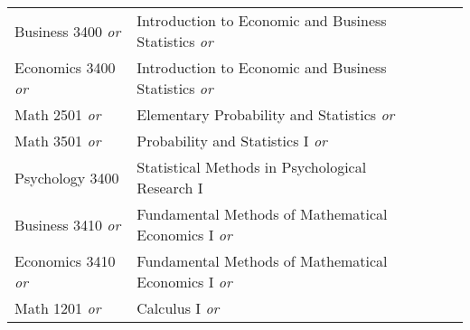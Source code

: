 \documentclass{article}
\begin{document}
\begin{Form}
\begin{longtable}{ |p{2.8cm}|p{6cm}|p{4.8cm}|p{2.3cm}|  }
						Business 3400 \emph{or} & Introduction to Economic and Business Statistics \emph{or} &  \TextField[name=3400a_instructor,width=4.8cm,charsize=8pt,bordercolor=1 1 1,borderstyle=U]{}    &  \TextField[name=3400a_grade,width=2.2cm,charsize=8pt,bordercolor=1 1 1]{{}}     \\
						
						Economics 3400 \emph{or}& Introduction to Economic and Business Statistics \emph{or} &   \TextField[name=3400b_instructor,width=4.8cm,charsize=8pt,bordercolor=1 1 1,borderstyle=U]{} &   \TextField[name=3400b_grade,width=2.2cm,charsize=8pt,bordercolor=1 1 1]{{}}    \\
						
						Math 2501 \emph{or} & Elementary Probability and Statistics \emph{or} &  \TextField[name=2501_instructor,width=4.8cm,charsize=8pt,bordercolor=1 1 1,borderstyle=U]{}    &  \TextField[name=2501_grade,width=2.2cm,charsize=8pt,bordercolor=1 1 1]{{}}     \\
						
						Math 3501 \emph{or} & Probability and Statistics I \emph{or} &   \TextField[name=3501_instructor,width=4.8cm,charsize=8pt,bordercolor=1 1 1,borderstyle=U]{} &   \TextField[name=3501_grade,width=2.2cm,charsize=8pt,bordercolor=1 1 1]{{}}    \\
						
						Psychology 3400 & Statistical Methods in Psychological Research I &   \TextField[name=3400c_instructor,width=4.8cm,charsize=8pt,bordercolor=1 1 1,borderstyle=U]{} &   \TextField[name=3400c_grade,width=2.2cm,charsize=8pt,bordercolor=1 1 1]{{}}    \\
						\hline
						
						Business 3410 \emph{or} & Fundamental Methods of Mathematical Economics I \emph{or} &  \TextField[name=3410_instructor,width=4.8cm,charsize=8pt,bordercolor=1 1 1,borderstyle=U]{}    &  \TextField[name=3410_grade,width=2.2cm,charsize=8pt,bordercolor=1 1 1]{{}}     \\
						
						Economics 3410 \emph{or}& Fundamental Methods of Mathematical Economics I \emph{or} &   \TextField[name=3410_instructor,width=4.8cm,charsize=8pt,bordercolor=1 1 1,borderstyle=U]{} &   \TextField[name=3410_grade,width=2.2cm,charsize=8pt,bordercolor=1 1 1]{{}}    \\
						
						Math 1201 \emph{or} & Calculus I \emph{or} &  \TextField[name=1201_instructor,width=4.8cm,charsize=8pt,bordercolor=1 1 1,borderstyle=U]{}    &  \TextField[name=1201_grade,width=2.2cm,charsize=8pt,bordercolor=1 1 1]{{}}     \\
						

\end{longtable}
\end{Form}
\end{document}

